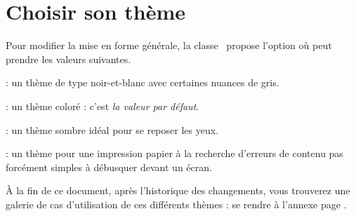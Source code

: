 \documentclass{tutodoc}
\begin{document}
\section{Choisir son thème}

Pour modifier la mise en forme générale, la classe \thisproj\ propose l'option  où  peut prendre les valeurs suivantes.

\begin{tasks}[style=itemize]
    \task {}:
          un thème de type noir-et-blanc avec certaines nuances de gris.

    \task {}:
          un thème coloré : c'est \emph{la valeur par défaut}.

    \task {}:
          un thème sombre idéal pour se reposer les yeux.

    \task {}:
          un thème pour une impression papier à la recherche d'erreurs de contenu pas forcément simples à débusquer devant un écran.
\end{tasks}


\begin{tdocnote}
    À la fin de ce document, après l'historique des changements, vous trouverez une galerie de cas d'utilisation de ces différents thèmes : se rendre à l'annexe page \pageref{tutodoc-theme-gallery}.
\end{tdocnote}
\end{document}
